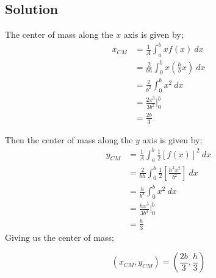 \documentclass{article}
\begin{document}
\subsection*{Solution}
The center of mass along the $x$ axis is given by;
\begin{align*}
	x_{CM} &= \frac{1}{A} \int_a^b x f(x)\ dx \\
	&= \frac{2}{bh} \int_0^b x \left(\frac{h}{b}x\right)\ dx \\
	&= \frac{2}{b^2} \int_0^b x^2 \ dx \\
	&= \frac{2x^3}{3b^2} \biggr\rvert_0^b \\
	&= \frac{2b}{3}
\end{align*}

Then the center of mass along the $y$ axis is given by;
\begin{align*}
	y_{CM} &= \frac{1}{A} \int_a^b \frac{1}{2} \left[ f(x) \right]^2\ dx \\
	       &= \frac{2}{bh} \int_0^b \frac{1}{2} \left[ \frac{h^2x^2}{b^2} \right] \ dx \\
	       &= \frac{h}{b^3} \int_0^b x^2 \ dx \\
	       &= \frac{hx^3}{3b^3} \biggr\rvert_0^b \\
	       &= \frac{h}{3}
\end{align*}
Giving us the center of mass;

\[
	\left( x_{CM}, y_{CM}\right) = \boxed{\left( \frac{2b}{3}, \frac{h}{3} \right)}
\]
\end{document}
